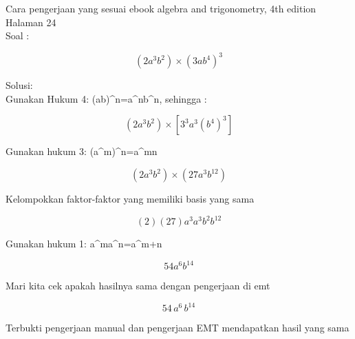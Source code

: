 \documentclass{article}
\newenvironment{eulernotebook}{\par}{\par}
\newenvironment{eulercomment}{\par\medskip}{\par\medskip}
\newenvironment{eulerformula}{}{}
\begin{document}
\begin{eulernotebook}
\begin{eulercomment}
Cara pengerjaan yang sesuai ebook algebra and trigonometry, 4th
edition\\
Halaman 24\\
Soal :\\
\end{eulercomment}
\begin{eulerformula}
\[
(2a^{3}b^2)\times (3ab^{4})^3
\]
\end{eulerformula}
\begin{eulercomment}
Solusi:\\
Gunakan Hukum 4: (ab)\textasciicircum{}n=a\textasciicircum{}nb\textasciicircum{}n, sehingga :\\
\end{eulercomment}
\begin{eulerformula}
\[
(2a^{3}b^2)\times [3^3a^3(b^{4})^3]
\]
\end{eulerformula}
\begin{eulercomment}
Gunakan hukum 3: (a\textasciicircum{}m)\textasciicircum{}n=a\textasciicircum{}mn\\
\end{eulercomment}
\begin{eulerformula}
\[
(2a^{3}b^2)\times (27a^3b^{12})
\]
\end{eulerformula}
\begin{eulercomment}
Kelompokkan faktor-faktor yang memiliki basis yang sama\\
\end{eulercomment}
\begin{eulerformula}
\[
(2)(27)a^{3}a^3b^2b^{12}
\]
\end{eulerformula}
\begin{eulercomment}
Gunakan hukum 1: a\textasciicircum{}ma\textasciicircum{}n=a\textasciicircum{}m+n\\
\end{eulercomment}
\begin{eulerformula}
\[
54a^{6}b^{14}
\]
\end{eulerformula}
\begin{eulercomment}
Mari kita cek apakah hasilnya sama dengan pengerjaan di emt
\end{eulercomment}
\begin{eulerformula}
\[
54\,a^6\,b^{14}
\]
\end{eulerformula}
\begin{eulercomment}
Terbukti pengerjaan manual dan pengerjaan EMT mendapatkan hasil yang
sama


\end{eulercomment}
\end{eulernotebook}
\end{document}
